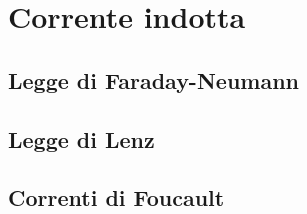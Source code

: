 
\section{Corrente indotta}

\subsection{Legge di Faraday-Neumann}

\subsection{Legge di Lenz}

\subsection{Correnti di Foucault}